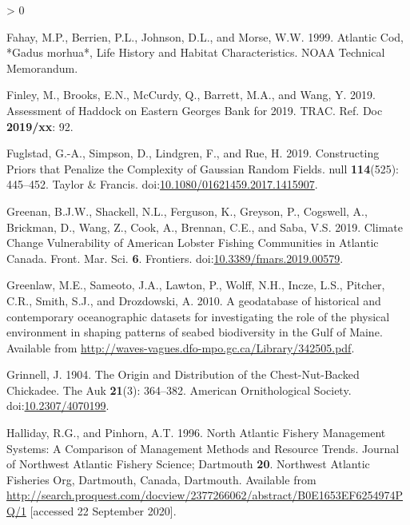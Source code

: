 \documentclass[
]{article}
\newlength{\cslhangindent}
\newenvironment{CSLReferences}[2] %
 {%
  \setlength{\parindent}{0pt}
  \ifodd #1 \everypar{\setlength{\hangindent}{\cslhangindent}}\ignorespaces\fi
  \ifnum #2 > 0
  \setlength{\parskip}{#2\baselineskip}
  \fi
 }%
 {}
\begin{document}
\begin{CSLReferences}{1}{0}
\leavevmode\hypertarget{ref-fahayAtlanticCodGadus1999}{}%
Fahay, M.P., Berrien, P.L., Johnson, D.L., and Morse, W.W. 1999. Atlantic {Cod}, *{Gadus} morhua*, {Life History} and {Habitat Characteristics}. NOAA Technical Memorandum.

\leavevmode\hypertarget{ref-finleyAssessmentHaddockEastern2019}{}%
Finley, M., Brooks, E.N., McCurdy, Q., Barrett, M.A., and Wang, Y. 2019. Assessment of {Haddock} on {Eastern Georges Bank} for 2019. TRAC. Ref. Doc \textbf{2019/xx}: 92.

\leavevmode\hypertarget{ref-fuglstadConstructingPriorsThat2019}{}%
Fuglstad, G.-A., Simpson, D., Lindgren, F., and Rue, H. 2019. Constructing {Priors} that {Penalize} the {Complexity} of {Gaussian Random Fields}. null \textbf{114}(525): 445--452. {Taylor \& Francis}. doi:\href{https://doi.org/10.1080/01621459.2017.1415907}{10.1080/01621459.2017.1415907}.

\leavevmode\hypertarget{ref-greenanClimateChangeVulnerability2019}{}%
Greenan, B.J.W., Shackell, N.L., Ferguson, K., Greyson, P., Cogswell, A., Brickman, D., Wang, Z., Cook, A., Brennan, C.E., and Saba, V.S. 2019. Climate {Change Vulnerability} of {American Lobster Fishing Communities} in {Atlantic Canada}. Front. Mar. Sci. \textbf{6}. {Frontiers}. doi:\href{https://doi.org/10.3389/fmars.2019.00579}{10.3389/fmars.2019.00579}.

\leavevmode\hypertarget{ref-greenlawGeodatabaseHistoricalContemporary2010}{}%
Greenlaw, M.E., Sameoto, J.A., Lawton, P., Wolff, N.H., Incze, L.S., Pitcher, C.R., Smith, S.J., and Drozdowski, A. 2010. A geodatabase of historical and contemporary oceanographic datasets for investigating the role of the physical environment in shaping patterns of seabed biodiversity in the {Gulf} of {Maine}. Available from \url{http://waves-vagues.dfo-mpo.gc.ca/Library/342505.pdf}.

\leavevmode\hypertarget{ref-grinnellOriginDistributionChestNutBacked1904}{}%
Grinnell, J. 1904. The {Origin} and {Distribution} of the {Chest}-{Nut}-{Backed Chickadee}. The Auk \textbf{21}(3): 364--382. {American Ornithological Society}. doi:\href{https://doi.org/10.2307/4070199}{10.2307/4070199}.

\leavevmode\hypertarget{ref-hallidayNorthAtlanticFishery1996}{}%
Halliday, R.G., and Pinhorn, A.T. 1996. North {Atlantic Fishery Management Systems}: {A Comparison} of {Management Methods} and {Resource Trends}. Journal of Northwest Atlantic Fishery Science; Dartmouth \textbf{20}. {Northwest Atlantic Fisheries Org}, {Dartmouth, Canada, Dartmouth}. Available from \url{http://search.proquest.com/docview/2377266062/abstract/B0E1653EF6254974PQ/1} {[}accessed 22 September 2020{]}.


\end{CSLReferences}
\end{document}
